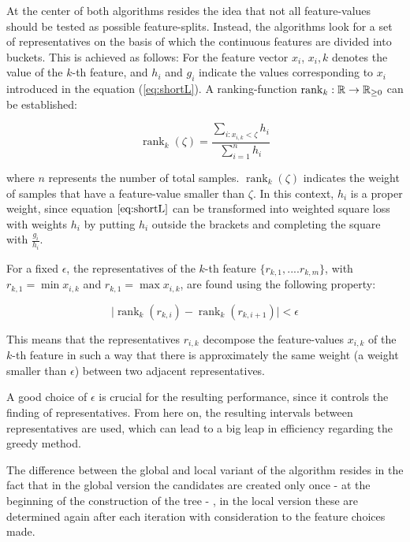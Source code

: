 \newcommand{\rnk}{\operatorname{rank}}
At the center of both algorithms resides the idea that not all feature-values should be tested as possible feature-splits. Instead, the algorithms look for a set of representatives on the basis of which the continuous features are divided into buckets. This is achieved as follows: For the feature vector $x_i$, $x_i,k$ denotes the value of the $k$-th feature, and $h_i$ and $g_i$ indicate the values corresponding to $x_i$ introduced in the equation (\ref{eq:shortL}).
A ranking-function $\rnk_k : \R\to \R_{\geq 0}$ can be established:

\begin{equation} \label{eq:ranking}
	\rnk_k(\zeta) = \frac{\sum\limits_{i: x_{i,k} < \zeta} h_i}{\sum\limits_{i=1}^n h_i}
\end{equation}

where $n$ represents the number of total samples. $\rnk_k(\zeta)$ indicates the weight of samples that have a feature-value smaller than $\zeta$. In this context, $h_i$ is a proper weight, since equation $\ref{eq:shortL}$ can be transformed into weighted square loss with weights $h_i$ by putting $h_i$ outside the brackets and completing the square with $\frac{g_i}{h_i}$.

\newpage
For a fixed $\epsilon$, the representatives of the $k$-th feature $\{r_{k,1}, ... .r_{k,m}\}$, with $r_{k,1} = \min x_{i,k}$ and $r_{k,1} = \max x_{i,k}$, are found using the following property:

\begin{equation}
	\mid \rnk_k(r_{k,i}) - \rnk_k(r_{k,i+1}) \mid < \epsilon
\end{equation}

This means that the representatives $r_{i,k}$ decompose the feature-values $x_{i,k}$ of the $k$-th feature in such a way that there is approximately the same weight (a weight smaller than $\epsilon$) between two adjacent representatives.

A good choice of $\epsilon$ is crucial for the resulting performance, since it controls the finding of representatives. From here on, the resulting intervals between representatives are used, which can lead to a big leap in efficiency regarding the greedy method.

The difference between the global and local variant of the algorithm resides in the fact that in the global version the candidates are created only once - at the beginning of the construction of the tree - , in the local version these are determined again after each iteration with consideration to the feature choices made.

